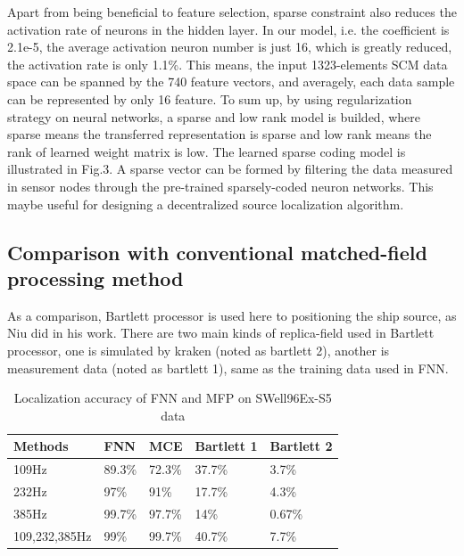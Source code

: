 Apart from being beneficial to feature selection, sparse constraint also reduces the activation rate of neurons in the hidden layer. In our model, i.e. the coefficient is 2.1e-5, the average activation neuron number is just 16, which is greatly reduced, the activation rate is only 1.1{\%}.
This means, the input 1323-elements SCM  data space can be spanned by the 740 feature vectors, and averagely, each data sample can be represented by only 16 feature. To sum up, by using regularization strategy on neural networks, a sparse and low rank model is builded, where sparse means the transferred representation is sparse and low rank means the rank of learned weight matrix is low. The learned sparse coding model is illustrated in Fig.3.
A sparse vector can be formed by filtering the data measured in sensor nodes through the pre-trained sparsely-coded neuron networks.
This maybe useful for designing a decentralized source localization algorithm.%

\subsection{Comparison with conventional matched-field processing method}
As a comparison, Bartlett processor is used here to positioning the ship source, as Niu did in his work. There are two main kinds of replica-field used in Bartlett processor, one is simulated by kraken (noted as bartlett 2), another is measurement data (noted as bartlett 1), same as the training data used in FNN.
\begin{table}[]
\caption{Localization accuracy of FNN and MFP on SWell96Ex-S5 data}
\label{my-label}
\begin{tabular}{@{}lllll@{}}
\toprule
Methods       & FNN    & MCE    & Bartlett 1 & Bartlett 2 \\ \midrule
109Hz         & 89.3\% & 72.3\% & 37.7\%     & 3.7\%      \\
232Hz         & 97\%   & 91\%   & 17.7\%     & 4.3\%      \\
385Hz         & 99.7\% & 97.7\% & 14\%       & 0.67\%     \\
109,232,385Hz & 99\%   & 99.7\% & 40.7\%     & 7.7\%      \\ \bottomrule
\end{tabular}
\end{table}

